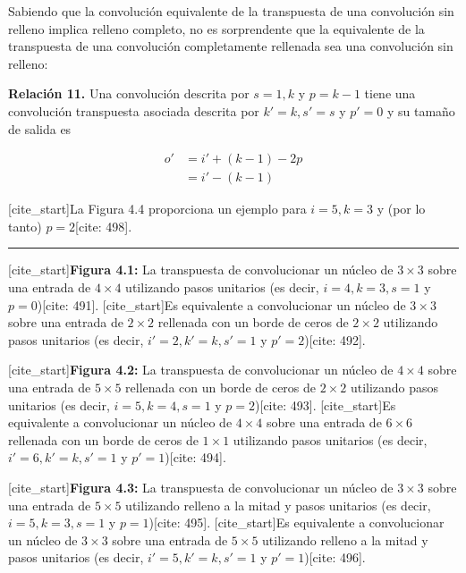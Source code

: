 \documentclass[
  super,
  preprint,
  3p]{elsarticle}
\begin{document}
Sabiendo que la convolución equivalente de la transpuesta de una
convolución sin relleno implica relleno completo, no es sorprendente que
la equivalente de la transpuesta de una convolución completamente
rellenada sea una convolución sin relleno:

\textbf{Relación 11.} Una convolución descrita por \(s = 1, k\) y
\(p = k - 1\) tiene una convolución transpuesta asociada descrita por
\(k' = k, s' = s\) y \(p' = 0\) y su tamaño de salida es

\[
\begin{aligned}
o' &= i' + (k - 1) - 2p \\
&= i' - (k - 1)
\end{aligned}
\]

{[}cite\_start{]}La Figura 4.4 proporciona un ejemplo para
\(i = 5, k = 3\) y (por lo tanto) \(p = 2\){[}cite: 498{]}.

\begin{center}\rule{0.5\linewidth}{0.5pt}\end{center}

{[}cite\_start{]}\textbf{Figura 4.1:} La transpuesta de convolucionar un
núcleo de \(3 \times 3\) sobre una entrada de \(4 \times 4\) utilizando
pasos unitarios (es decir, \(i = 4, k = 3, s = 1\) y \(p = 0\)){[}cite:
491{]}. {[}cite\_start{]}Es equivalente a convolucionar un núcleo de
\(3 \times 3\) sobre una entrada de \(2 \times 2\) rellenada con un
borde de ceros de \(2 \times 2\) utilizando pasos unitarios (es decir,
\(i' = 2, k' = k, s' = 1\) y \(p' = 2\)){[}cite: 492{]}.

{[}cite\_start{]}\textbf{Figura 4.2:} La transpuesta de convolucionar un
núcleo de \(4 \times 4\) sobre una entrada de \(5 \times 5\) rellenada
con un borde de ceros de \(2 \times 2\) utilizando pasos unitarios (es
decir, \(i = 5, k = 4, s = 1\) y \(p = 2\)){[}cite: 493{]}.
{[}cite\_start{]}Es equivalente a convolucionar un núcleo de
\(4 \times 4\) sobre una entrada de \(6 \times 6\) rellenada con un
borde de ceros de \(1 \times 1\) utilizando pasos unitarios (es decir,
\(i' = 6, k' = k, s' = 1\) y \(p' = 1\)){[}cite: 494{]}.

{[}cite\_start{]}\textbf{Figura 4.3:} La transpuesta de convolucionar un
núcleo de \(3 \times 3\) sobre una entrada de \(5 \times 5\) utilizando
relleno a la mitad y pasos unitarios (es decir, \(i = 5, k = 3, s = 1\)
y \(p = 1\)){[}cite: 495{]}. {[}cite\_start{]}Es equivalente a
convolucionar un núcleo de \(3 \times 3\) sobre una entrada de
\(5 \times 5\) utilizando relleno a la mitad y pasos unitarios (es
decir, \(i' = 5, k' = k, s' = 1\) y \(p' = 1\)){[}cite: 496{]}.
\end{document}
